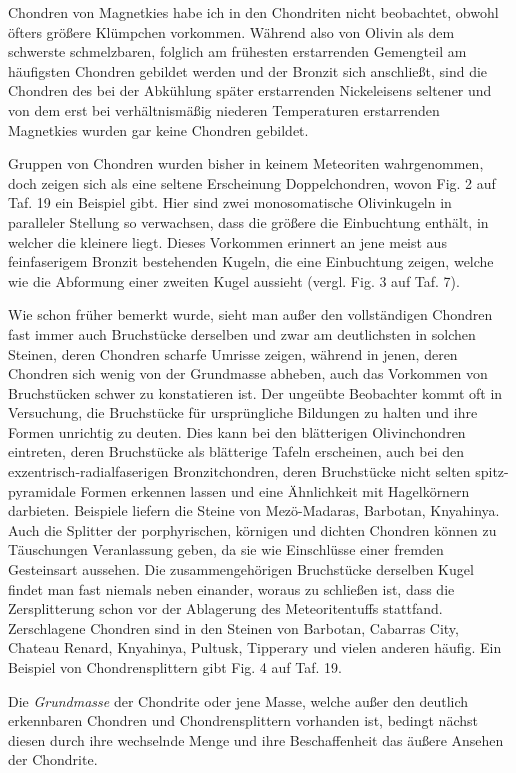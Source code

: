 \documentclass[a4paper, 12pt, oneside]{article}
\begin{document}
Chondren von Magnetkies habe ich in den Chondriten nicht beobachtet, obwohl öfters größere Klümpchen vorkommen. Während also von Olivin als dem schwerste schmelzbaren, folglich am frühesten erstarrenden Gemengteil am häufigsten Chondren gebildet werden und der Bronzit sich anschließt, sind die Chondren des bei der Abkühlung später erstarrenden Nickeleisens seltener und von dem erst bei verhältnismäßig niederen Temperaturen erstarrenden Magnetkies wurden gar keine Chondren gebildet.

Gruppen von Chondren wurden bisher in keinem Meteoriten wahrgenommen, doch zeigen sich als eine seltene Erscheinung Doppelchondren, wovon Fig. 2 auf Taf. 19 ein Beispiel gibt. Hier sind zwei monosomatische Olivinkugeln in paralleler Stellung so verwachsen, dass die größere die Einbuchtung enthält, in welcher die kleinere liegt. Dieses Vorkommen erinnert an jene meist aus feinfaserigem Bronzit bestehenden Kugeln, die eine Einbuchtung zeigen, welche wie die Abformung einer zweiten Kugel aussieht (vergl. Fig. 3 auf Taf. 7).

Wie schon früher bemerkt wurde, sieht man außer den vollständigen Chondren fast immer auch Bruchstücke derselben und zwar am deutlichsten in solchen Steinen, deren Chondren scharfe Umrisse zeigen, während in jenen, deren Chondren sich wenig von der Grundmasse abheben, auch das Vorkommen von Bruchstücken schwer zu konstatieren ist. Der ungeübte Beobachter kommt oft in Versuchung, die Bruchstücke für ursprüngliche Bildungen zu halten und ihre Formen unrichtig zu deuten. Dies kann bei den blätterigen Olivinchondren eintreten, deren Bruchstücke als blätterige Tafeln erscheinen, auch bei den exzentrisch-radialfaserigen Bronzitchondren, deren Bruchstücke nicht selten spitz-pyramidale Formen erkennen lassen und eine Ähnlichkeit mit Hagelkörnern darbieten. Beispiele liefern die Steine von Mezö-Madaras, Barbotan, Knyahinya. Auch die Splitter der porphyrischen, körnigen und dichten Chondren können zu Täuschungen Veranlassung geben, da sie wie Einschlüsse einer fremden Gesteinsart aussehen. Die zusammengehörigen Bruchstücke derselben Kugel findet man fast niemals neben einander, woraus zu schließen ist, dass die Zersplitterung schon vor der Ablagerung des Meteoritentuffs stattfand. Zerschlagene Chondren sind in den Steinen von Barbotan, Cabarras City, Chateau Renard, Knyahinya, Pultusk, Tipperary und vielen anderen häufig. Ein Beispiel von Chondrensplittern gibt Fig. 4 auf Taf. 19.

Die \emph{Grundmasse} der Chondrite oder jene Masse, welche außer den deutlich erkennbaren Chondren und Chondrensplittern vorhanden ist, bedingt nächst diesen durch ihre wechselnde Menge und ihre Beschaffenheit das äußere Ansehen der Chondrite.
\end{document}
